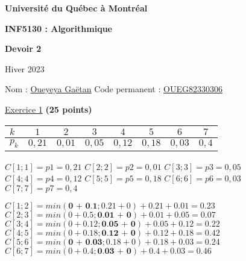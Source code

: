 \documentclass[11pt]{article}
\begin{document}
\thispagestyle{empty}

\begin{center}
\textbf{\Large Université du Qu\'ebec \`a Montr\'eal}

\bigskip
\bigskip

\textbf{\LARGE INF5130 : Algorithmique}

\bigskip
\bigskip
\bigskip

\textbf{\LARGE Devoir 2}

\vspace{0.5em}

\bigskip
\bigskip

\large

Hiver 2023

\bigskip

\normalsize

\bigskip
\bigskip

\end{center}





\rm

\bigskip
\bigskip

Nom : \underline{Oueyeya Gaëtan} \hfill{}  Code permanent : \underline{OUEG82330306} 


\newpage

\thispagestyle{empty}

\underline{Exercice 1} \textbf{(25 points)}

 \begin{center}
\begin{tabular}{ |l| c c c c c c c|}
 \hline 
 $k$ & $1$ & $2$ & $3$ & $4$ & $5$ & $6$ & $7$\\ 
 \hline 
 $p_k$ & $0,\!21$ & $0,\!01$ & $0,\!05$ & $0,\!12$ & $0,\!18$ & $0,\!03$ & $0,\!4$ \\
  \hline 
\end{tabular}
\end{center}

\bigskip

\begin{center}
    $C[1; 1] = p1 = 0,21$ \quad $C[2; 2] = p2 = 0,01$ \quad $C[3; 3] = p3 = 0,05$\\ \smallskip
    $C[4; 4] = p4 = 0,12$ \quad $C[5; 5] = p5 = 0,18$ \quad $C[6; 6] = p6 = 0,03$\\ \smallskip
    $C[7; 7] = p7 = 0,4$
\end{center}

\bigskip

$C[1; 2] = min(\textbf{0 + 0.1} ; 0.21 + 0) + 0.21 + 0.01 = 0.23$\\ \smallskip
$C[2; 3] = min(0 + 0.5 ; \textbf{0.01 + 0}) + 0.01 + 0.05= 0.07$\\ \smallskip
$C[3; 4] = min(0 + 0.12 ; \textbf{0.05 + 0}) + 0.05 + 0.12= 0.22$\\ \smallskip
$C[4; 5] = min(0 + 0.18 ; \textbf{0.12 + 0}) + 0.12 + 0.18= 0.42$\\ \smallskip
$C[5; 6] = min(\textbf{0 + 0.03} ; 0.18 + 0) + 0.18 + 0.03= 0.24$\\ \smallskip
$C[6; 7] = min(0 + 0.4 ; \textbf{0.03 + 0}) + 0.4 + 0.03= 0.46$\\ \smallskip
\end{document}
